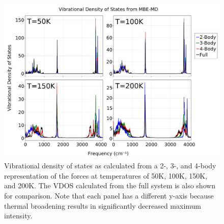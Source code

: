 \begin{figure}[t]
\uwsinglespace
\begin{center}
\begin{minipage}{0.9\textwidth}
\includegraphics[width=\textwidth]{Figures/Chapter_4/ch4_figure_4.png}
\end{minipage}
\end{center}
\begin{spacing}{1.0}
\caption[Vibrational density of states as calculated from a 2-, 3-, and 4-body representation of the forces at temperatures of 50K, 100K, 150K, and 200K. The VDOS calculated from the full system is also shown for comparison. Note that each panel has a different y-axis because thermal broadening results in significantly decreased maximum intensity.]{Vibrational density of states as calculated from a 2-, 3-, and 4-body representation of the forces at temperatures of 50K, 100K, 150K, and 200K. The VDOS calculated from the full system is also shown for comparison. Note that each panel has a different y-axis because thermal broadening results in significantly decreased maximum intensity.}\label{fig:MBE_MD_F4}
\end{spacing}
\end{figure}